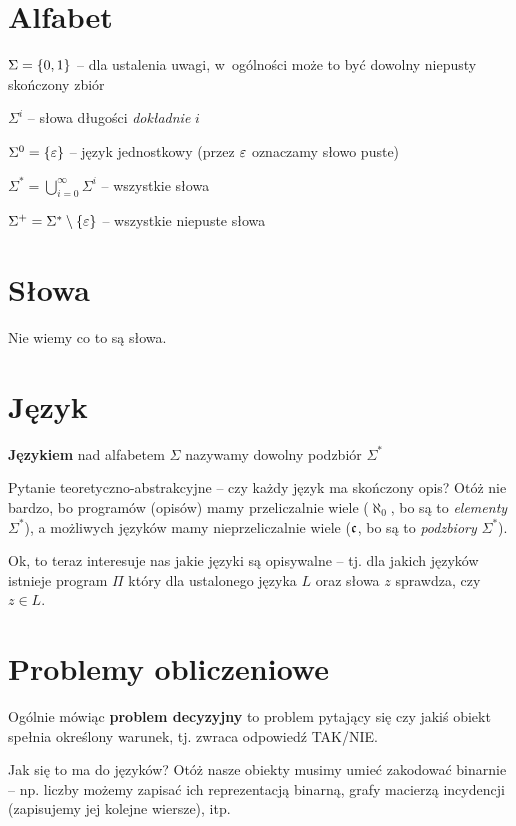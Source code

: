 \section{Alfabet}
\begin{description}
	\item \( \Sigma = \set{0, 1} \) -- dla ustalenia uwagi, w~ogólności może to być dowolny niepusty skończony zbiór
	\item \( \Sigma^i \) -- słowa długości \emph{dokładnie} \( i \)
	\item \( \Sigma^0 = \set{\eps} \) -- język jednostkowy (przez \(\varepsilon\) oznaczamy słowo puste)
	\item \( \Sigma^* = \bigcup_{i=0}^\infty \Sigma^i \) -- wszystkie słowa
	\item \( \Sigma^+ = \Sigma^* \setminus \set{\eps} \) -- wszystkie niepuste słowa
\end{description}

\section{Słowa}
Nie wiemy co to są słowa.

\section{Język}
\begin{definition}[Język]
	\textbf{Językiem} nad alfabetem \( \Sigma \) nazywamy dowolny podzbiór \( \Sigma^* \)
\end{definition}

Pytanie teoretyczno-abstrakcyjne -- czy każdy język ma skończony opis?
Otóż nie bardzo, bo programów (opisów) mamy przeliczalnie wiele (\(\aleph_0\), bo są to \emph{elementy} \(\Sigma^*\)), a możliwych języków mamy nieprzeliczalnie wiele (\(\mathfrak{c}\), bo są to \emph{podzbiory} \(\Sigma^*\)).

Ok, to teraz interesuje nas jakie języki są opisywalne -- tj. dla jakich języków istnieje program \( \Pi \) który dla ustalonego języka \( L \) oraz słowa \( z \) sprawdza, czy \( z \in L \).

\section{Problemy obliczeniowe}
Ogólnie mówiąc \textbf{problem decyzyjny} to problem pytający się czy jakiś obiekt spełnia określony warunek, tj. zwraca odpowiedź TAK/NIE.

Jak się to ma do języków?
Otóż nasze obiekty musimy umieć zakodować binarnie -- np. liczby możemy zapisać ich reprezentacją binarną, grafy macierzą incydencji (zapisujemy jej kolejne wiersze), itp.

